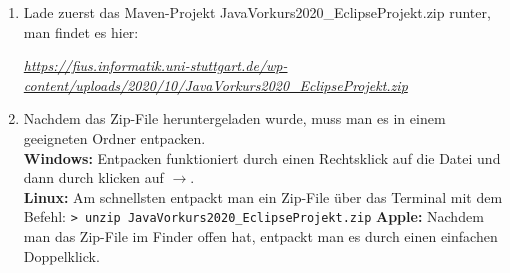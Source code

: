 
\newcommand{\jvkpackage}{JavaVorkurs2020\_EclipseProjekt.zip}
\newcommand{\jvkpackageurl}{https://fius.informatik.uni-stuttgart.de/wp-content/uploads/2020/10/JavaVorkurs2020\_EclipseProjekt.zip} 



\begin{Infobox}
    \begin{enumerate}[label=\arabic*.]
        \item Lade zuerst das Maven-Projekt \jvkpackage { }runter, man findet es hier:
        \begin{center}
            \color{blue}\href{\jvkpackageurl}{\textit{\jvkpackageurl}}
        \end{center}

        \item Nachdem das Zip-File heruntergeladen wurde, muss man es in einem geeigneten Ordner entpacken.\\
        \textbf{Windows:} Entpacken funktioniert durch einen Rechtsklick auf die Datei und dann durch klicken auf $\to$.\\
        \textbf{Linux:} Am schnellsten entpackt man ein Zip-File über das Terminal mit dem Befehl:
        \newline\hspace*{\fill}\texttt{\textgreater\ unzip \jvkpackage}\hspace*{\fill}\newline
        \textbf{Apple:} Nachdem man das Zip-File im Finder offen hat, entpackt man es durch einen einfachen Doppelklick.
    \end{enumerate}
\end{Infobox}


